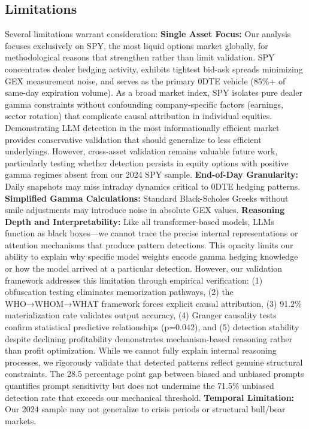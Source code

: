 \subsection{Limitations}
Several limitations warrant consideration:
\textbf{Single Asset Focus:} Our analysis focuses exclusively on SPY, the most liquid options market globally, for methodological reasons that strengthen rather than limit validation. SPY concentrates dealer hedging activity, exhibits tightest bid-ask spreads minimizing GEX measurement noise, and serves as the primary 0DTE vehicle (85\%+ of same-day expiration volume). As a broad market index, SPY isolates pure dealer gamma constraints without confounding company-specific factors (earnings, sector rotation) that complicate causal attribution in individual equities. Demonstrating LLM detection in the most informationally efficient market provides conservative validation that should generalize to less efficient underlyings. However, cross-asset validation remains valuable future work, particularly testing whether detection persists in equity options with positive gamma regimes absent from our 2024 SPY sample.
\textbf{End-of-Day Granularity:} Daily snapshots may miss intraday dynamics critical to 0DTE hedging patterns.
\textbf{Simplified Gamma Calculations:} Standard Black-Scholes Greeks without smile adjustments may introduce noise in absolute GEX values.
\textbf{Reasoning Depth and Interpretability:} Like all transformer-based models, LLMs function as black boxes—we cannot trace the precise internal representations or attention mechanisms that produce pattern detections. This opacity limits our ability to explain why specific model weights encode gamma hedging knowledge or how the model arrived at a particular detection. However, our validation framework addresses this limitation through empirical verification: (1) obfuscation testing eliminates memorization pathways, (2) the WHO→WHOM→WHAT framework forces explicit causal attribution, (3) 91.2\% materialization rate validates output accuracy, (4) Granger causality tests confirm statistical predictive relationships (p=0.042), and (5) detection stability despite declining profitability demonstrates mechanism-based reasoning rather than profit optimization. While we cannot fully explain internal reasoning processes, we rigorously validate that detected patterns reflect genuine structural constraints. The 28.5 percentage point gap between biased and unbiased prompts quantifies prompt sensitivity but does not undermine the 71.5\% unbiased detection rate that exceeds our mechanical threshold.
\textbf{Temporal Limitation:} Our 2024 sample may not generalize to crisis periods or structural bull/bear markets.

